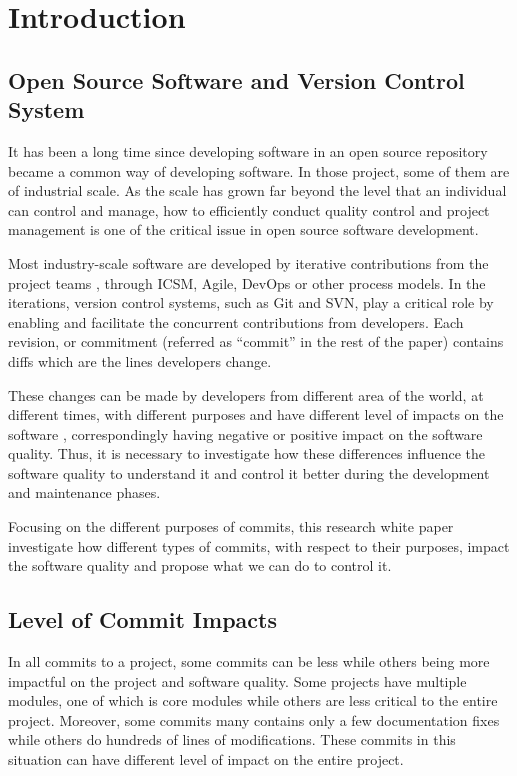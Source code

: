 \section{Introduction}
\label{sec:introduction}


\subsection{Open Source Software and Version Control System}
It has been a long time since developing software in an open source repository became a common way of developing software. 
In those project, some of them are of industrial scale.
As the scale has grown far beyond the level that an individual can control and manage, how to efficiently conduct quality control and project management is one of the critical issue in open source software development.

Most industry-scale software are developed by iterative contributions from the project teams \cite{}, through ICSM, Agile, DevOps or other process models. 
In the iterations, version control systems, such as Git and SVN, play a critical role by enabling and facilitate the concurrent contributions from developers.
Each revision, or commitment (referred as ``commit'' in the rest of the paper) contains diffs which are the lines developers change.

These changes can be made by developers from different area of the world, at different times, with different purposes and have different level of impacts on the software \cite{qrs2020}, correspondingly having negative or positive impact on the software quality. 
Thus, it is necessary to investigate how these differences influence the software quality to understand it and control it better during the development and maintenance phases. 

Focusing on the different purposes of commits, this research white paper investigate how different types of commits, with respect to their purposes, impact the software quality and propose what we can do to control it. 


\subsection{Level of Commit Impacts}
In all commits to a project, some commits can be less while others being more impactful on the project and software quality.
Some projects have multiple modules, one of which is core modules while others are less critical to the entire project. 
Moreover, some commits many contains only a few documentation fixes while others do hundreds of lines of modifications.
These commits in this situation can have different level of impact on the entire project.

